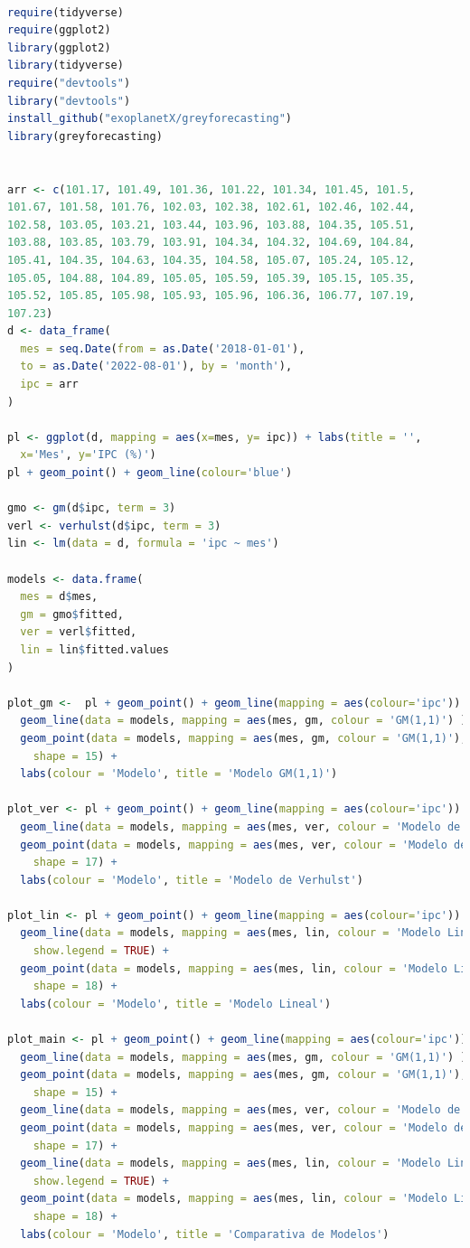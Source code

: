 \documentclass[a4paper,10pt]{article}
\begin{document}
\begin{lstlisting}[language = R]

require(tidyverse)
require(ggplot2)
library(ggplot2)
library(tidyverse)
require("devtools")
library("devtools")
install_github("exoplanetX/greyforecasting")
library(greyforecasting)


arr <- c(101.17, 101.49, 101.36, 101.22, 101.34, 101.45, 101.5,
101.67, 101.58, 101.76, 102.03, 102.38, 102.61, 102.46, 102.44,
102.58, 103.05, 103.21, 103.44, 103.96, 103.88, 104.35, 105.51,
103.88, 103.85, 103.79, 103.91, 104.34, 104.32, 104.69, 104.84,
105.41, 104.35, 104.63, 104.35, 104.58, 105.07, 105.24, 105.12,
105.05, 104.88, 104.89, 105.05, 105.59, 105.39, 105.15, 105.35,
105.52, 105.85, 105.98, 105.93, 105.96, 106.36, 106.77, 107.19,
107.23)
d <- data_frame(
  mes = seq.Date(from = as.Date('2018-01-01'),
  to = as.Date('2022-08-01'), by = 'month'),
  ipc = arr
)

pl <- ggplot(d, mapping = aes(x=mes, y= ipc)) + labs(title = '',
  x='Mes', y='IPC (%)')
pl + geom_point() + geom_line(colour='blue')

gmo <- gm(d$ipc, term = 3)
verl <- verhulst(d$ipc, term = 3)
lin <- lm(data = d, formula = 'ipc ~ mes')

models <- data.frame(
  mes = d$mes,
  gm = gmo$fitted,
  ver = verl$fitted,
  lin = lin$fitted.values
)

plot_gm <-  pl + geom_point() + geom_line(mapping = aes(colour='ipc')) +
  geom_line(data = models, mapping = aes(mes, gm, colour = 'GM(1,1)') ) +
  geom_point(data = models, mapping = aes(mes, gm, colour = 'GM(1,1)'),
    shape = 15) +
  labs(colour = 'Modelo', title = 'Modelo GM(1,1)')

plot_ver <- pl + geom_point() + geom_line(mapping = aes(colour='ipc')) +
  geom_line(data = models, mapping = aes(mes, ver, colour = 'Modelo de Verhulst')) +
  geom_point(data = models, mapping = aes(mes, ver, colour = 'Modelo de Verhulst'),
    shape = 17) +
  labs(colour = 'Modelo', title = 'Modelo de Verhulst')

plot_lin <- pl + geom_point() + geom_line(mapping = aes(colour='ipc')) +
  geom_line(data = models, mapping = aes(mes, lin, colour = 'Modelo Lineal'),
    show.legend = TRUE) +
  geom_point(data = models, mapping = aes(mes, lin, colour = 'Modelo Lineal'),
    shape = 18) +
  labs(colour = 'Modelo', title = 'Modelo Lineal')

plot_main <- pl + geom_point() + geom_line(mapping = aes(colour='ipc')) +
  geom_line(data = models, mapping = aes(mes, gm, colour = 'GM(1,1)') ) +
  geom_point(data = models, mapping = aes(mes, gm, colour = 'GM(1,1)'),
    shape = 15) +
  geom_line(data = models, mapping = aes(mes, ver, colour = 'Modelo de Verhulst')) +
  geom_point(data = models, mapping = aes(mes, ver, colour = 'Modelo de Verhulst'),
    shape = 17) +
  geom_line(data = models, mapping = aes(mes, lin, colour = 'Modelo Lineal'),
    show.legend = TRUE) +
  geom_point(data = models, mapping = aes(mes, lin, colour = 'Modelo Lineal'),
    shape = 18) +
  labs(colour = 'Modelo', title = 'Comparativa de Modelos')


\end{lstlisting}
\end{document}
